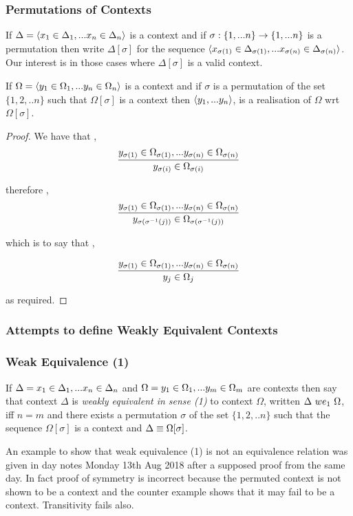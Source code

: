 \documentclass[10pt,a4paper]{scrartcl}
\begin{document}
\subsubsection{Permutations of Contexts}
If $\Delta = \langle x_1 \in \Delta_1,... x_{n} \in \Delta_{n}\rangle$ is a context and if $\sigma: \left\{1,...n\right\} \rightarrow \left\{1,...n\right\}$ is a permutation then write $\Delta[\sigma]$ for the
sequence $\langle x_{\sigma(1)} \in \Delta_{\sigma(1)},... x_{\sigma(n)} \in \Delta_{\sigma(n)}\rangle$. Our  interest is in those cases where $\Delta[\sigma]$ is a valid context.  
\begin{lemma}
If $\Omega = \langle y_1 \in \Omega_1,... y_{n} \in \Omega_{n}\rangle$ is a context and if $\sigma$ is a permutation of the set $\{1,2,..n\}$ such that $\Omega[\sigma]$ is a context then
$\langle y_1,...y_n\rangle$, is a realisation of $\Omega$ wrt $\Omega[\sigma]$.
\end{lemma}
\begin{proof}
We have that \foreachi,
\begin{equation*}
\frac{y_{\sigma(1)} \in \Omega_{\sigma(1)},... y_{\sigma(n)} \in \Omega_{\sigma(n)}}{y_{\sigma(i)} \in \Omega_{\sigma(i)}}
\end{equation*}

therefore \foreachj, 
\begin{equation*}
\frac
{y_{\sigma(1)} \in \Omega_{\sigma(1)},... y_{\sigma(n)} \in \Omega_{\sigma(n)}}     
        {y_{\sigma(\sigma^{-1}(j))} \in \Omega_{\sigma(\sigma^{-1}(j))}
				}
\end{equation*}

which is to say that \foreachj, 

\begin{equation*}
\frac{y_{\sigma(1)} \in \Omega_{\sigma(1)},... y_{\sigma(n)} \in \Omega_{\sigma(n)}}{y_j \in \Omega_{j}}
\end{equation*}

as required.
\end{proof}
\subsubsection{Attempts to define Weakly Equivalent Contexts}

\subsubsection{Weak Equivalence (1)}
\begin{definition}
If $\Delta = x_1 \in \Delta_1,... x_{n} \in \Delta_{n}$ and $\Omega=y_1 \in \Omega_1,... y_{m} \in \Omega_{m}$ are contexts then say that context $\Delta$
is \textit{weakly equivalent in sense (1) } to context $\Omega$, written $\Delta\ we_1\ \Omega$,  iff $n=m$ and there exists a permutation $\sigma$ of the set $\{1,2,..n\}$
such that the sequence $\Omega[\sigma]$ 
is a context and $\Delta \equiv \Omega[\sigma]$.
\end{definition}
\begin{framed}
An example to show that weak equivalence (1) is not an equivalence relation was given in day notes Monday 13th Aug 2018 after a supposed proof from the same day.
In fact proof of symmetry is incorrect because the permuted context is not shown to be a context and the counter example shows that
it may fail to be a context. Transitivity fails also. 
\end{framed}
\end{document}
